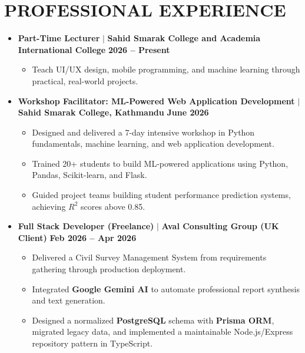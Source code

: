 \documentclass[10pt,a4paper]{article}
\begin{document}
\section{PROFESSIONAL EXPERIENCE}

\begin{itemize}[leftmargin=1em, label={}]
    \item \textbf{Part-Time Lecturer} $|$ \textbf{Sahid Smarak College and Academia International College} \hfill \textbf{2026 -- Present}
    \begin{itemize}
        \item Teach UI/UX design, mobile programming, and machine learning through practical, real-world projects.
    \end{itemize}

    \vspace{6pt}

    \item \textbf{Workshop Facilitator: ML-Powered Web Application Development} $|$ \textbf{Sahid Smarak College, Kathmandu} \hfill \textbf{June 2026}
    \begin{itemize}
        \item Designed and delivered a 7-day intensive workshop in Python fundamentals, machine learning, and web application development.
        \item Trained 20+ students to build ML-powered applications using Python, Pandas, Scikit-learn, and Flask.
        \item Guided project teams building student performance prediction systems, achieving $R^2$ scores above 0.85.
    \end{itemize}

    \vspace{6pt}

    \item \textbf{Full Stack Developer (Freelance)} $|$ \textbf{Aval Consulting Group (UK Client)} \hfill \textbf{Feb 2026 -- Apr 2026}
    \begin{itemize}
        \item Delivered a Civil Survey Management System from requirements gathering through production deployment.
        \item Integrated \textbf{Google Gemini AI} to automate professional report synthesis and text generation.
        \item Designed a normalized \textbf{PostgreSQL} schema with \textbf{Prisma ORM}, migrated legacy data, and implemented a maintainable Node.js/Express repository pattern in TypeScript.
    \end{itemize}


\end{itemize}
\end{document}
